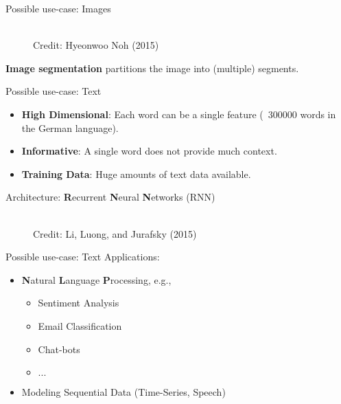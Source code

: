 \begin{frame} {Possible use-case: Images}
\begin{figure}
\centering
{}
\\
\tiny{Credit: Hyeonwoo Noh (2015)} 
\end{figure}
\textbf{Image segmentation} partitions the image into (multiple) segments.
\end{frame}

\begin{frame} {Possible use-case: Text}
\begin{itemize}
\item \textbf{High Dimensional}: Each word can be a single feature (~300000 words in the German language).
\vspace{.1cm}
\item \textbf{Informative}: A single word does not provide much context.
\vspace{.1cm}
\item \textbf{Training Data}: Huge amounts of text data available.
\end{itemize}
\vspace{.3cm}
Architecture: \textbf{R}ecurrent \textbf{N}eural \textbf{N}etworks (RNN)
\begin{figure}
\centering
{}
\\
\tiny{Credit: Li, Luong, and Jurafsky (2015)} 
\end{figure}
\end{frame}

\begin{frame} {Possible use-case: Text}
Applications:
\vspace{.7cm}
\begin{itemize}
\item \textbf{N}atural \textbf{L}anguage \textbf{P}rocessing, e.g.,
\begin{itemize}
\item Sentiment Analysis
\vspace{.3cm}
\item Email Classification
\vspace{.3cm}
\item Chat-bots
\vspace{.3cm}
\item $...$
\end{itemize}
\vspace{.7cm}
\item Modeling Sequential Data (Time-Series, Speech)
\end{itemize}
\end{frame}

